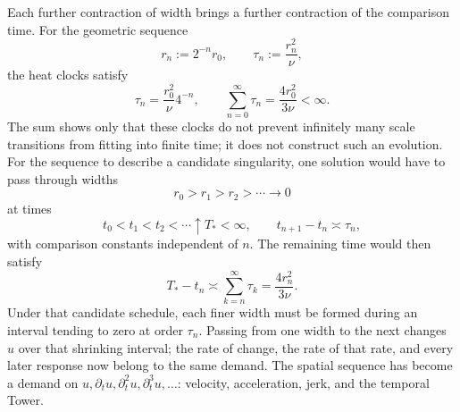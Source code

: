 Each further contraction of width brings a further contraction of the comparison time.
For the geometric sequence
\[
  r_n:=2^{-n}r_0,
  \qquad
  \tau_n:=\frac{r_n^2}{\nu},
\]
the heat clocks satisfy
\[
  \tau_n
  =
  \frac{r_0^2}{\nu}4^{-n},
  \qquad
  \sum_{n=0}^{\infty}\tau_n
  =
  \frac{4r_0^2}{3\nu}
  <
  \infty.
\]
The sum shows only that these clocks do not prevent infinitely many scale transitions from fitting into finite time; it does not construct such an evolution.
For the sequence to describe a candidate singularity, one \NavierStokes{} solution would have to pass through widths
\[
  r_0>r_1>r_2>\cdots\longrightarrow0
\]
at times
\[
  t_0<t_1<t_2<\cdots\uparrow T_*<\infty,
  \qquad
  t_{n+1}-t_n\asymp\tau_n,
\]
with comparison constants independent of \(n\).
The remaining time would then satisfy
\[
  T_*-t_n
  \asymp
  \sum_{k=n}^{\infty}\tau_k
  =
  \frac{4r_n^2}{3\nu}.
\]
Under that candidate schedule, each finer width must be formed during an interval tending to zero at order \(\tau_n\).
Passing from one width to the next changes \(u\) over that shrinking interval; the rate of change, the rate of that rate, and every later response now belong to the same demand.
The spatial sequence has become a demand on \(u,\partial_tu,\partial_t^2u,\partial_t^3u,\ldots\): velocity, acceleration, jerk, and the temporal Tower.
